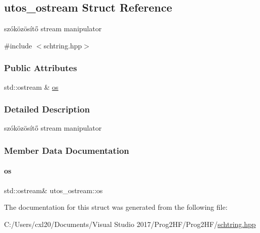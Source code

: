 \hypertarget{structutos__ostream}{}\subsection{utos\+\_\+ostream Struct Reference}
\label{structutos__ostream}


szóközösítő stream manipulator  




{\ttfamily \#include $<$schtring.\+hpp$>$}

\subsubsection*{Public Attributes}
\begin{DoxyCompactItemize}
\item 
std\+::ostream \& \mbox{\hyperlink{structutos__ostream_aec8d0c25d29aa2cea8ade1cfb60fb3ef}{os}}
\end{DoxyCompactItemize}


\subsubsection{Detailed Description}
szóközösítő stream manipulator 

\subsubsection{Member Data Documentation}
\mbox{\label{structutos__ostream_aec8d0c25d29aa2cea8ade1cfb60fb3ef}} 
\paragraph{\texorpdfstring{os}{os}}
{\footnotesize\ttfamily std\+::ostream\& utos\+\_\+ostream\+::os}



The documentation for this struct was generated from the following file\+:\begin{DoxyCompactItemize}
\item 
C\+:/\+Users/cxl20/\+Documents/\+Visual Studio 2017/\+Prog2\+H\+F/\+Prog2\+H\+F/\mbox{\hyperlink{schtring_8hpp}{schtring.\+hpp}}\end{DoxyCompactItemize}
